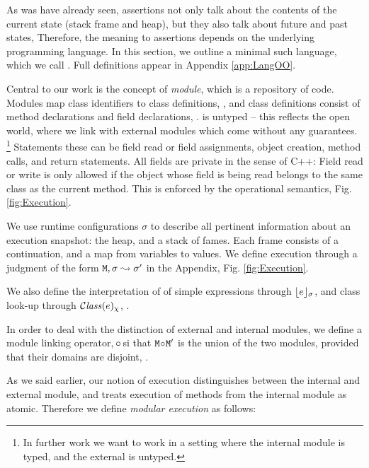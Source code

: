  
 
As was have already seen, \Chainmail assertions not only talk about the contents of the current state (stack frame and heap),
but they also talk about future and past states, Therefore, the meaning to \Chainmail assertions depends on the underlying programming
language. In this section, we outline a minimal such language, which we call  \LangOO. Full definitions appear in Appendix \ref{app:LangOO}. 

Central to our work is the concept of \emph{module}, which is a repository of code. Modules map class identifiers to class definitions, , and class definitions consist of method declarations and field declarations, .  \LangOO is untyped -- this reflects the open world, where we link with external modules which come without any guarantees. \footnote{In further work we want to work in a setting where the internal module is typed, and the external is untyped.} Statements
these can be field read or field assignments, object creation, method calls, and return statements.
All fields are private in the sense of C++: Field read or write is only allowed  if the object whose field is being read 
belongs to the same class as the current method. 
This is enforced by the operational semantics, \cf
Fig.  \ref{fig:Execution}.

We use runtime configurations $\sigma$ to describe   all pertinent information about an execution snapshot: the heap, and a
stack of fames. Each frame consists of a continuation,  and a map from variables to values. We define execution  through a judgment of the form ${\mbox{\tt{\ensuremath{{\mbox{\tt{M}}}}}}}, \sigma \leadsto \sigma'$ in the Appendix, Fig.  \ref{fig:Execution}. 

We also  define the
interpretation of of simple expressions through ${\lfloor{ {e}}\rfloor_{\sigma}}$, and class look-up through ${\mathcal C}{\mathit{lass}}(e)_{\chi} $, .
  

In  order to deal with the distinction of external and internal modules, we define a module linking operator,  $\!\circ\!$ si that
${\mbox{\tt{\ensuremath{{\mbox{\tt{M}}}}}}}\!\circ\!{\mbox{\tt{\ensuremath{{\mbox{\tt{M}}}}}}}'$ is the union of the two modules, provided that their domains are disjoint, .


As we said earlier, our notion of execution distinguishes between the internal and external module, and treats execution of 
methods from the internal module as atomic. Therefore we define \emph{modular execution}  as follows:


